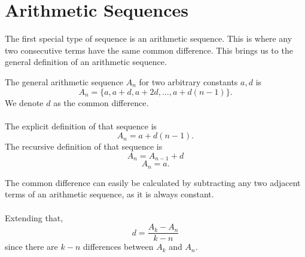 \section{Arithmetic Sequences}
The first special type of sequence is an arithmetic sequence. This is where any two consecutive terms have the same common difference. This brings us to the general definition of an arithmetic sequence.
\begin{definition}
    The general arithmetic sequence $A_n$ for two arbitrary constants $a, d$ is 
    \[A_n=\{a, a+d, a+2d, \dots, a+d(n-1)\}.\]
    We denote $d$ as the common difference.\\\\
    The explicit definition of that sequence is
    \[A_n=a+d(n-1).\]
    The recursive definition of that sequence is
    \[A_n=A_{n-1}+d\]
    \[A_n=a.\]
\end{definition}
The common difference can easily be calculated by subtracting any two adjacent terms of an arithmetic sequence, as it is always constant. \\\\
Extending that, 
\[d=\frac{A_k-A_n}{k-n}\]
since there are $k-n$ differences between $A_k$ and $A_n$.
